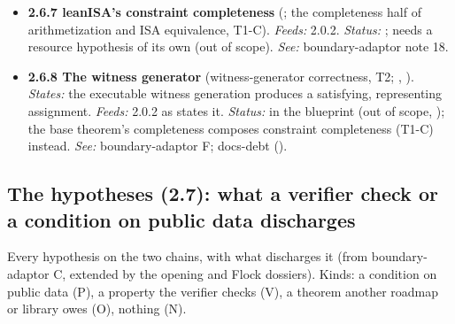 \begin{itemize}[label={}, leftmargin=1.3em, itemindent=-1.3em, labelwidth=0pt, labelsep=0pt, itemsep=4pt, topsep=3pt]
\item {}\label{obl:node-2.6.7}\textbf{2.6.7 leanISA's constraint completeness} (; the completeness half of arithmetization and ISA equivalence, T1-C). \emph{Feeds:} 2.0.2. \emph{Status:} ; needs a resource hypothesis of its own (out of scope). \emph{See:} boundary-adaptor note 18.
\item {}\label{obl:node-2.6.8}\textbf{2.6.8 The witness generator} (witness-generator correctness, T2; , ). \emph{States:} the executable witness generation produces a satisfying, representing assignment. \emph{Feeds:} 2.0.2 as  states it. \emph{Status:}  in the blueprint (out of scope, ); the base theorem's completeness composes constraint completeness (T1-C) instead. \emph{See:} boundary-adaptor F; docs-debt ().
\end{itemize}
\endgroup

\subsection[The hypotheses (2.7)]{The hypotheses (2.7): what a verifier check or a condition on public data discharges}\label{sec:obl-tier-hypotheses}

Every hypothesis on the two chains, with what discharges it (from boundary-adaptor C, extended by the opening and Flock dossiers). Kinds: a condition on public data (P), a property the verifier checks (V), a theorem another roadmap or library owes (O), nothing (N).

